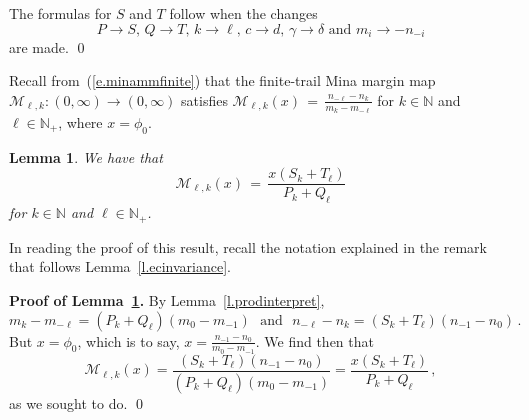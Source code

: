 \documentclass[letterpaper,11pt,oneside,reqno]{amsbook}
\newcommand{\N}{\ensuremath{\mathbb{N}}}
\numberwithin{figure}{chapter}
\newtheorem{lemma}[theorem]{Lemma}
\theoremstyle{definition}
\theoremstyle{definition}
\theoremstyle{definition}
\theoremstyle{definition}
\theoremstyle{definition}
\newcommand{\nwithzero}{\N}
\newcommand{\nwithoutzero}{\N_+}
\newcommand{\macsee}{c}
\newcommand{\macdee}{d}
\newcommand{\macphi}{\phi}
\newcommand{\macgsee}{\gamma}
\newcommand{\macgdee}{\delta}
\newcommand{\minamm}{\mathcal{M}}
\begin{document}
 The formulas for $S$ and $T$ follow when the changes 
 $$
 \textrm{$P \to S$, $Q \to T$, $k \to \ell$, $\macsee \to \macdee$, $\macgsee \to \macgdee$ 
and $m_i \to -n_{-i}$} 
$$
are made. \qed

Recall from~(\ref{e.minammfinite}) that the finite-trail Mina margin map  $\minamm_{\ell,k}:(0,\infty) \to (0,\infty)$
satisfies    $\minamm_{\ell,k}(x)
 \, = \, \frac{n_{-\ell} - n_k}{m_k - m_{-\ell}}$
for $k \in \nwithzero$ and $\ell \in \nwithoutzero$, where  $x = \macphi_0$. 
\begin{lemma}\label{l.ratiointerpret}
We have that
$$
   \minamm_{\ell,k}(x)
 \, = \, \frac{x(S_k + T_\ell)}{P_k + Q_\ell} 
 $$
for $k \in \nwithzero$ and $\ell \in \nwithoutzero$. 
\end{lemma}
In reading the proof of this result, recall the notation explained in the remark that follows Lemma~\ref{l.ecinvariance}.

{\bf Proof of Lemma~\ref{l.ratiointerpret}.} By Lemma~\ref{l.prodinterpret}, 
\begin{equation}\label{e.pqstformulas}
m_k - m_{-\ell}  = (P_k+Q_\ell)(m_0 - m_{-1}) \, \, \, \, 
\textrm{and} \, \, \, \,    n_{-\ell} - n_k = (S_k + T_\ell) (n_{-1} - n_0)  \, . 
\end{equation}
But $x = \macphi_0$, which is to say, $x = \tfrac{n_{-1} - n_0}{m_0 - m_{-1}}$. We find then that 
$$
 \minamm_{\ell,k}(x) = \frac{(S_k + T_\ell) (n_{-1} - n_0)}{(P_k+Q_\ell)(m_0 - m_{-1})} =  \frac{x(S_k + T_\ell)}{P_k+Q_\ell} \, ,
$$
as we sought to do. \qed
\end{document}

